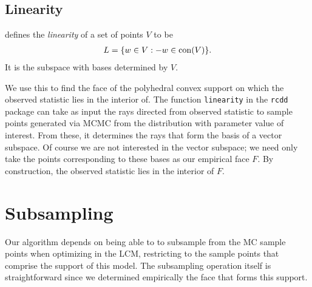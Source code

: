 \subsection{Linearity}\label{S:linearity}
\citet{Geyer:gdor} defines the \emph{linearity} of a set of points $V$ to be
\begin{align*}
	L = \{ w \in V: -w \in \operatorname{con}( V ) \}.
\end{align*}
It is the subspace with bases determined by $V$.

We use this to find the face of the polyhedral convex support on which the observed 
statistic lies in the interior of.  The function \texttt{linearity} in the \texttt
{rcdd} package can take as input the rays directed from observed statistic to sample 
points generated via MCMC from the distribution with parameter value of interest.  
From these, it determines the rays that form the basis of a vector subspace.  Of 
course we are not interested in the vector subspace; we need only take the points 
corresponding to these bases as our empirical face $F$.  By construction, the observed 
statistic lies in the interior of $F$.





\section{Subsampling}
Our algorithm depends on being able to to subsample from the MC sample points when 
optimizing in the LCM, restricting to the sample points that comprise the support of 
this model.  The subsampling operation itself is straightforward since we determined 
empirically the face that forms this support.  

